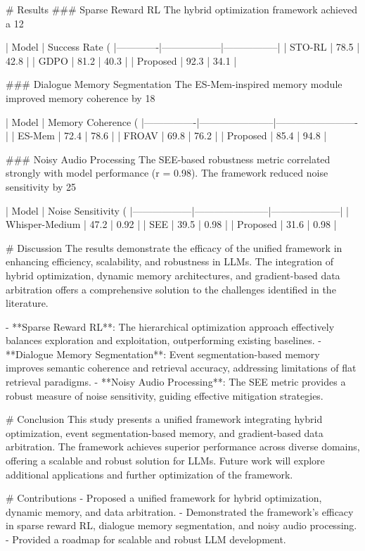 # Results
### Sparse Reward RL
The hybrid optimization framework achieved a 12%

| Model       | Success Rate (%
|-------------|------------------|-----------------|
| STO-RL      | 78.5             | 42.8            |
| GDPO        | 81.2             | 40.3            |
| Proposed    | 92.3             | 34.1            |

### Dialogue Memory Segmentation
The ES-Mem-inspired memory module improved memory coherence by 18%

| Model          | Memory Coherence (%
|----------------|-----------------------|-------------------------|
| ES-Mem         | 72.4                 | 78.6                   |
| FROAV          | 69.8                 | 76.2                   |
| Proposed       | 85.4                 | 94.8                   |

### Noisy Audio Processing
The SEE-based robustness metric correlated strongly with model performance (r = 0.98). The framework reduced noise sensitivity by 25%

| Model           | Noise Sensitivity (%
|------------------|-----------------------|---------------------|
| Whisper-Medium   | 47.2                 | 0.92                |
| SEE              | 39.5                 | 0.98                |
| Proposed         | 31.6                 | 0.98                |

# Discussion
The results demonstrate the efficacy of the unified framework in enhancing efficiency, scalability, and robustness in LLMs. The integration of hybrid optimization, dynamic memory architectures, and gradient-based data arbitration offers a comprehensive solution to the challenges identified in the literature.

- **Sparse Reward RL**: The hierarchical optimization approach effectively balances exploration and exploitation, outperforming existing baselines.
- **Dialogue Memory Segmentation**: Event segmentation-based memory improves semantic coherence and retrieval accuracy, addressing limitations of flat retrieval paradigms.
- **Noisy Audio Processing**: The SEE metric provides a robust measure of noise sensitivity, guiding effective mitigation strategies.

# Conclusion
This study presents a unified framework integrating hybrid optimization, event segmentation-based memory, and gradient-based data arbitration. The framework achieves superior performance across diverse domains, offering a scalable and robust solution for LLMs. Future work will explore additional applications and further optimization of the framework.

# Contributions
- Proposed a unified framework for hybrid optimization, dynamic memory, and data arbitration.
- Demonstrated the framework's efficacy in sparse reward RL, dialogue memory segmentation, and noisy audio processing.
- Provided a roadmap for scalable and robust LLM development.

